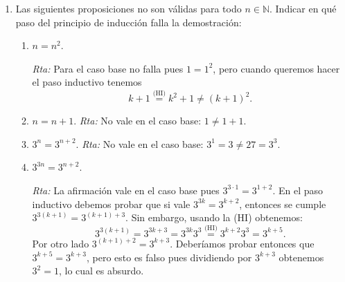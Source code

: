 \documentclass[a4paper,12pt,twoside,spanish,reqno]{amsbook}
\numberwithin{equation}{section}
\newcommand{\rta}{\noindent\textit{Rta: }}
\begin{document}
\begin{enumerate}
        
        \item Las siguientes proposiciones no son válidas para todo $n \in {\mathbb N}$. Indicar en qué paso del principio de inducción falla la demostración:
            \begin{enumerate}
                \item  $n=n^2$.
                
                \rta Para el caso base no falla pues $1 = 1^2$,  pero cuando queremos hacer el paso inductivo tenemos
                \begin{equation*}
                    k+1 \overset{\text{(HI)}}{=} k^2 +1 \not=(k+1)^2.
                \end{equation*}
                
                \item  $n=n+1$. \rta No vale en el caso base: $1 \ne 1+1$.
                \item  $3^n = 3^{n+2}$.  \rta No vale en el caso base: $3^1 = 3 \ne 27 = 3^3$.
                \item  $3^{3n} = 3^{n+2}$.  
                
                \rta La afirmación vale en el caso base pues  $3^{3\cdot 1} = 3^{1+2}$. En el paso inductivo debemos probar que si  vale $3^{3k} = 3^{k+2}$, entonces se cumple $3^{3(k+1)} = 3^{(k+1)+3}$. Sin embargo, usando  la (HI) obtenemos:
                \begin{equation*}
                3^{3(k+1)}  = 3^{3k+3} = 3^{3k}3^3\overset{\text{(HI)}}{=} 3^{k+2}3^3 = 3^{k+5}.
                \end{equation*}
                Por otro  lado $3^{(k+1)+2} = 3^{k+3}$. Deberíamos probar entonces que $3^{k+5} = 3^{k+3}$, pero esto es falso pues dividiendo  por $3^{k+3}$ obtenemos $3^2 =1$,  lo cual es absurdo.
        \end{enumerate}
        
        
        


        \end{enumerate}
\end{document}
